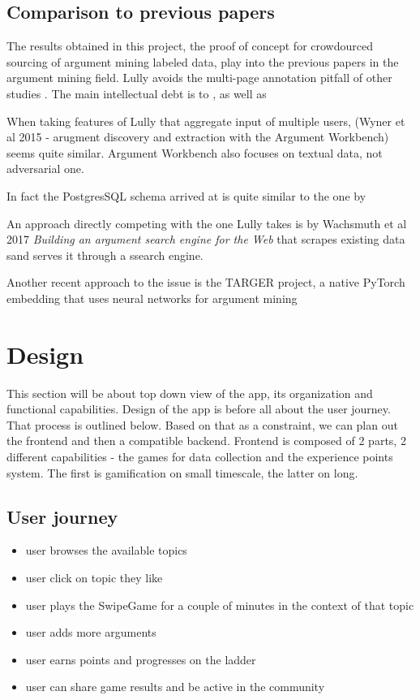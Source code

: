 \documentclass{report}
\begin{document}
\section{Comparison to previous papers}
The results obtained in this project, the proof of concept for crowdourced sourcing of argument mining labeled data, play into the previous papers in the argument mining field.
Lully avoids the multi-page annotation pitfall of other studies \cite{teufel_towards_2009}.
The main intellectual debt is to \cite{von_ahn_designing_2008}, as well as \cite{poesio_phrase_2013}

When taking features of Lully that aggregate input of multiple users, (Wyner et al 2015 - arugment discovery and extraction with the Argument Workbench) seems quite similar. Argument Workbench also focuses on textual data, not adversarial one. 

In fact the PostgresSQL schema arrived at is quite similar to the one by 
\cite{abbott_internet_2016}

An approach directly competing with the one Lully takes is by Wachsmuth et al 2017 \textit{Building an argument search engine for the Web} that scrapes existing data sand serves it through a ssearch engine.
\cite{wachsmuth_building_2017}

\cite{fromm_towards_2022}

Another recent approach to the issue is the TARGER project, a native PyTorch embedding that uses neural networks for argument mining

\cite{chernodub_targer_2019}


\chapter{Design}
This section will be about top down view of the app, its organization and functional capabilities.
Design of the app is before all about the user journey. That process is outlined below. Based on that as a constraint, we can plan out the frontend and then a compatible backend.
Frontend is composed of 2 parts, 2 different capabilities - the games for data collection and the experience points system. The first is gamification on small timescale, the latter on long.

\section{User journey}
\begin{itemize}
  \item user browses the available topics
  \item user click on topic they like
  \item user plays the SwipeGame for a couple of minutes in the context of that topic
  \item user adds more arguments
  \item user earns points and progresses on the ladder
  \item user can share game results and be active in the community
\end{itemize}
\end{document}
